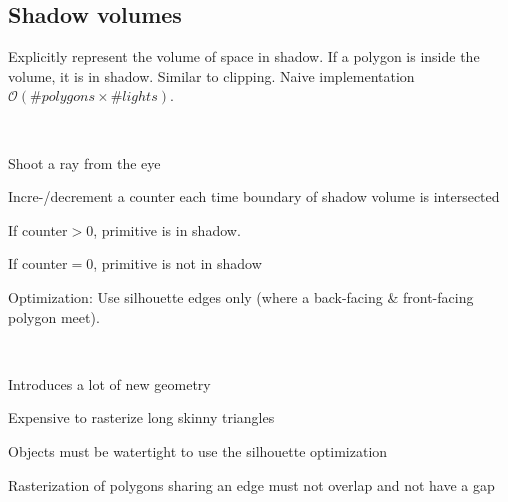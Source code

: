 \begin{compactdesc}
\section{Shadow volumes}
Explicitly represent the volume of space in shadow. If a polygon is inside the volume, it is in shadow. Similar to clipping. Naive implementation $\mathcal{O}(\#polygons\times\#lights)$.
\item[\lp{Algorithm}]\hfill\\
	\begin{enumerate*}[label=\protect\circled{\arabic*},itemjoin=]
		\item Shoot a ray from the eye\\
		\item Incre-/decrement a counter each time boundary of shadow volume is intersected\\
		\item If counter$>0$, primitive is in shadow.
		\item If counter$=0$, primitive is not in shadow
	\end{enumerate*}
	Optimization: Use silhouette edges only (where a back-facing \& front-facing polygon meet).
\item[\lp{Limitations}]\hfill\\
	\begin{enumerate*}[label=\protect\circled{\arabic*},itemjoin=]
		\item Introduces a lot of new geometry\\
		\item Expensive to rasterize long skinny triangles\\
		\item Objects must be watertight to use the silhouette optimization\\
		\item Rasterization of polygons sharing an edge must not overlap and not have a gap
	\end{enumerate*}
\end{compactdesc}
